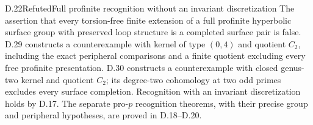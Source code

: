 \begin{claim}{D.22}{Refuted}{Full profinite recognition without an invariant discretization}
The assertion that every torsion-free finite extension of a full
profinite hyperbolic surface group with preserved loop structure
is a completed surface pair is false.  D.29 constructs a
counterexample with kernel of type $(0,4)$ and quotient $C_2$,
including the exact peripheral comparisons and a finite quotient
excluding every free profinite presentation. D.30 constructs a
counterexample with closed genus-two kernel and quotient $C_2$;
its degree-two cohomology at two odd primes excludes every
surface completion. Recognition with an
invariant discretization holds by D.17.  The separate pro-$p$
recognition theorems, with their precise group and peripheral
hypotheses, are proved in D.18--D.20.
\end{claim}
